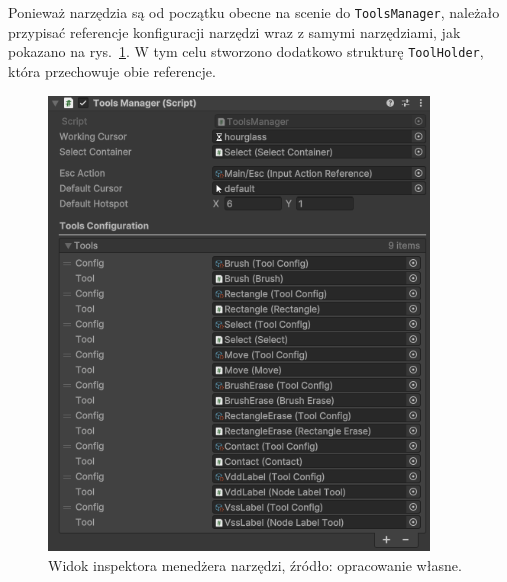 
\newpage %

Ponieważ narzędzia są od początku obecne na scenie do \texttt{ToolsManager},
należało przypisać referencje konfiguracji narzędzi wraz z samymi narzędziami,
jak pokazano na rys.~\ref{fig:tools_manager}.
W tym celu stworzono dodatkowo strukturę \texttt{ToolHolder},
która przechowuje obie referencje.

\begin{figure}[h!]
    \centering
    \includegraphics[width=0.9\textwidth]{chapters/chapter4/rys/tools_manager}
    \caption[Widok inspektora menedżera narzędzi.]{Widok inspektora menedżera narzędzi, źródło: opracowanie własne.}
    \label{fig:tools_manager}
\end{figure}

